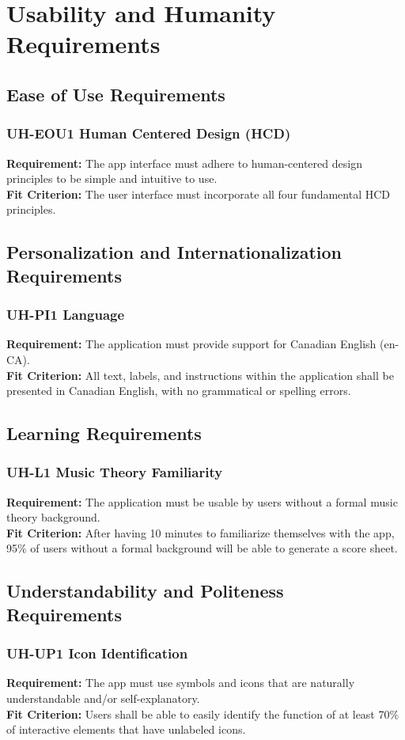 \documentclass[12pt]{article}
\begin{document}
\section{Usability and Humanity Requirements}
\subsection{Ease of Use Requirements}
\subsubsection*{UH-EOU1 Human Centered Design (HCD)}
\textbf{Requirement:} The app interface must adhere to human-centered design principles to be simple and intuitive to use.\\
\textbf{Fit Criterion:} The user interface must incorporate all four fundamental HCD principles.
\subsection{Personalization and Internationalization Requirements}
\subsubsection*{UH-PI1 Language}
\textbf{Requirement:} The application must provide support for Canadian English (en-CA).\\
\textbf{Fit Criterion:} All text, labels, and instructions within the application 
shall be presented in Canadian English, with no grammatical or spelling errors.
\subsection{Learning Requirements}
\subsubsection*{UH-L1 Music Theory Familiarity}
\textbf{Requirement:} The application must be usable by users without a formal music theory background. \\
\textbf{Fit Criterion:} After having 10 minutes to familiarize themselves with the app, 95\% of users without a 
formal background will be able to generate a score sheet.
\subsection{Understandability and Politeness Requirements}
\subsubsection*{UH-UP1 Icon Identification}
\textbf{Requirement:} The app must use symbols and icons that are naturally understandable and/or self-explanatory.\\
\textbf{Fit Criterion:} Users shall be able to easily identify the function of at least 70\% of interactive elements
that have unlabeled icons.
\end{document}
